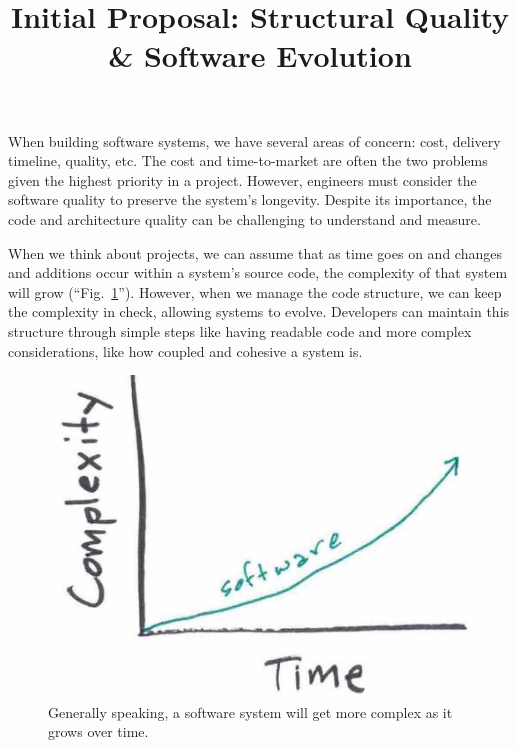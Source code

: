 \documentclass[12pt,conference]{IEEEtran}
\newcommand{\paperTitle}{Structural Quality \& Software Evolution}
\begin{document}
\pagestyle{plain}

\title{Initial Proposal: \paperTitle}

\author{
}

\maketitle

\doublespacing

When building software systems, we have several areas of concern: cost, delivery timeline, quality, etc. The cost and time-to-market are often the two problems given the highest priority in a project. However, engineers must consider the software quality to preserve the system's longevity. Despite its importance, the code and architecture quality can be challenging to understand and measure.

When we think about projects, we can assume that as time goes on and changes and additions occur within a system's source code, the complexity of that system will grow (``Fig.~\ref{figTimeAndComplexity}''). However, when we manage the code structure, we can keep the complexity in check, allowing systems to evolve. Developers can maintain this structure through simple steps like having readable code and more complex considerations, like how coupled and cohesive a system is.

\begin{figure}[ht]
    \centerline{
        \includegraphics[width=0.7\columnwidth]{TimeAndComplexity}
    }
    \caption{Generally speaking, a software system will get more complex as it grows over time.}
    \label{figTimeAndComplexity}
\end{figure}
\end{document}

